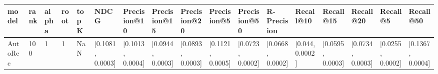 \begin{tabular}{lllllllllllllllll}
\toprule
   model & rank & alpha & root & topK &              NDCG &      Precision@10 &      Precision@15 &      Precision@20 &       Precision@5 &      Precision@50 &       R-Precision &        Recall@10 &         Recall@15 &         Recall@20 &          Recall@5 &         Recall@50 \\
\midrule
 AutoRec &  100 &     1 &    1 &  NaN &  [0.1081, 0.0003] &  [0.1013, 0.0004] &  [0.0944, 0.0003] &  [0.0893, 0.0003] &  [0.1121, 0.0005] &  [0.0723, 0.0002] &  [0.0668, 0.0002] &  [0.044, 0.0002] &  [0.0595, 0.0003] &  [0.0734, 0.0003] &  [0.0255, 0.0002] &  [0.1367, 0.0004] \\
\bottomrule
\end{tabular}
